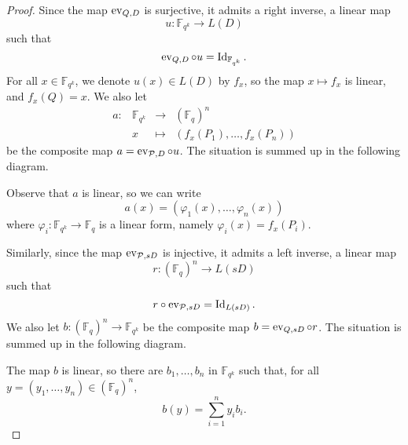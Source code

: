 \begin{proof}
  Since the map $\operatorname{ev}_{Q, D}$ is surjective, it admits a right inverse, \ie a linear
  map 
  \[
    u: \mathbb{F}_{q^k} \to L(D)
  \]
  such that
  \[
    \operatorname{ev}_{Q, D}\circ u = \operatorname{Id}_{\mathbb{F}_{q^k}}.
  \]
For all $x\in\mathbb{F}_{q^k}$, we denote $u(x)\in L(D)$ by $f_x$,
so the map $x\mapsto f_x$ is linear, and $f_x(Q)=x$. We
  also let
  \[
        \begin{array}{cccc}
          a: & \mathbb{F}_{q^k} & \to & (\mathbb{F}_{q})^n \\
          & x & \mapsto & (f_x(P_1), \dots, f_x(P_n))
\end{array}
  \]
  be the composite map $a = \operatorname{ev}_{\mathcal{P}, D}\circ u$. The situation is summed up in the
  following diagram.
   \begin{center}
  \end{center}
Observe that $a$ is linear, so we can write
\[ a(x) = (\varphi_1(x), \dots, \varphi_n(x)) \]
where $\varphi_i:\mathbb{F}_{q^k}\to\mathbb{F}_{q}$ is a linear form, namely $\varphi_i(x)=f_x(P_i)$.

  Similarly, since the map $\operatorname{ev}_{\mathcal{P}, sD}$ is injective, it admits a left inverse, \ie a linear
  map 
  \[
    r: (\mathbb{F}_{q})^n \to L(sD)
  \]
  such that 
  \[r\circ\operatorname{ev}_{\mathcal{P}, sD} = \operatorname{Id}_{L(sD)}.
  \]
We also let $b: (\mathbb{F}_{q})^n \to \mathbb{F}_{q^k}$
  be the composite map $b = \operatorname{ev}_{Q, sD}\circ r$.   The situation is summed up in the
  following diagram.
  \begin{center}
\end{center}
The map $b$ is linear, so there are $b_1, \dots, b_n$ in
  $\mathbb{F}_{q^k}$ such that, for all $y=(y_1, \dots, y_n)\in(\mathbb{F}_{q})^n$,
  \[
    b(y) = \sum_{i=1}^n y_i b_i.
  \]


\end{proof}
